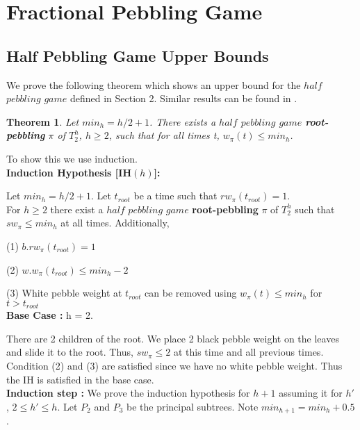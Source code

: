 \documentclass[12pt]{article}
\newtheorem{theorem}{Theorem}[subsection]
\newcommand{\troot}{t_{root}}
\begin{document}
\newpage





\section{Fractional Pebbling Game}

\subsection{Half Pebbling Game Upper Bounds} 

We prove the following theorem which shows an upper bound for the $half$ $pebbling$ $game$ defined in Section 2. Similar results can be found in \cite{c:pebjournal}.

\begin{theorem}
Let $min_h = h/2+1$.
There exists a $half$ $pebbling$ $game$ {\bf root-pebbling} $\pi$ of $T^h_2$, $h \geq 2$, such
that for all times t, $w_\pi(t) \le min_h$.
\end{theorem}

\noindent
To show this we use induction.\\

\noindent
{\bf Induction Hypothesis [IH$(h)$]:} 

\noindent
Let $min_h = h/2 + 1$.  Let $\troot$ be a time such that $rw_\pi(\troot)=1$.\\
For $h\geq 2$
there exist a $half$ $pebbling$ $game$ {\bf root-pebbling} $\pi$ of $T_2^h$ such that $sw_\pi \leq min_h$ at all times. Additionally,

(1) $b.rw_\pi(\troot) = 1$

(2) $w.w_\pi(\troot) \leq min_h-2$

(3) White pebble weight at $\troot$ can be removed using $w_\pi(t) \leq min_h$ for  $t > \troot$\\

\noindent
{\bf Base Case :} h = 2.

There are 2 children of the root. We place 2 black pebble weight on the leaves and slide it to the root. Thus, $sw_\pi \leq 2$ at this time and all previous times. Condition (2) and (3) are satisfied since we have no white pebble weight. Thus the IH is satisfied in the base case.\\

\noindent
{\bf Induction step :} We prove the induction hypothesis for $h+1$ assuming it for $h'$,
$2\le h' \le h$. Let $P_2$ and $P_3$ be the principal subtrees. Note $min_{h+1} = min_h + 0.5$.\\
\end{document}
